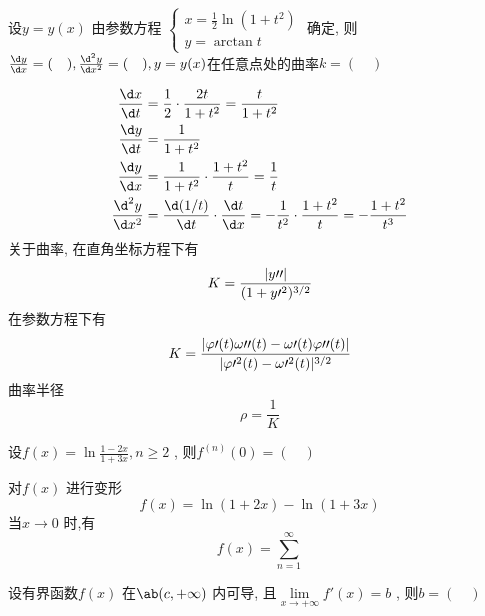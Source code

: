 \begin{question}
    设$ y = y(x) $ 由参数方程  $ 
    \begin{cases}
         x = \frac 1 2 \ln(1 + t^2)      \\
         y = \arctan t  
    \end{cases} $ 
    确定, 则$ \frac{\d y}{\d x} = (\quad) , \frac{\d^2 y}{\d x^2} = (\quad) , y = y(x) $在任意点处的曲率$ k = (\quad) $  
\end{question}
\begin{solution}
    \begin{align*}
        \frac{\d x}{\d t} &= \frac{1}{2} \cdot \frac{2t}{1 + t^2} = \frac{t}{1 + t^2}  \\  
        \frac{\d y}{\d t} &= \frac{1}{1 + t^2}  \\
        \frac{\d y}{\d x} &= \frac{1}{1 + t^2} \cdot \frac{1 + t^2}{t} = \frac{1}{t} \\
        \frac{\d^2 y}{\d x^2} &= \frac{\d (1 / t)}{\d t} \cdot \frac{\d t}{\d x} = -\frac{1}{t^2} \cdot \frac{1 + t^2}{t} = -\frac{1 + t^2}{t^3}
    \end{align*}
    关于曲率, 在直角坐标方程下有
    \begin{equation*}
        K = \frac{\lvert y\prime\prime\rvert}{(1 + y\prime^2)^{3 / 2}}
    \end{equation*}
    在参数方程下有
    \begin{equation*}
        K = \frac{\lvert \varphi\prime(t)\omega\prime\prime(t) - \omega\prime(t) \varphi\prime\prime(t)\rvert}{\lvert \varphi\prime^2(t) - \omega\prime^2(t) \rvert^{3/2}}
    \end{equation*}
    曲率半径
    \begin{equation*}
        \rho = \frac{1}{K}
    \end{equation*}
\end{solution}
\begin{question}
    设$ f(x) = \ln \frac{1 - 2x}{1 + 3x}, n \ge 2 $ , 则$ f^{(n)} (0) = (\quad) $ 
\end{question}
\begin{solution}
    对$ f(x) $ 进行变形
    \begin{equation*}
        f(x) = \ln (1 + 2x) - \ln (1 + 3x)
    \end{equation*}
    当$ x \to 0 $ 时,有
    \begin{equation*}
        f(x) = \sum_{n = 1}^{\infty}
    \end{equation*}
\end{solution}
\begin{question}
    设有界函数$ f(x) $ 在$ \ab(c, +\infty) $ 内可导, 且$ \lim\limits_{x \to +\infty} f\prime(x) = b $ , 则$ b = (\quad) $ 
\end{question}
